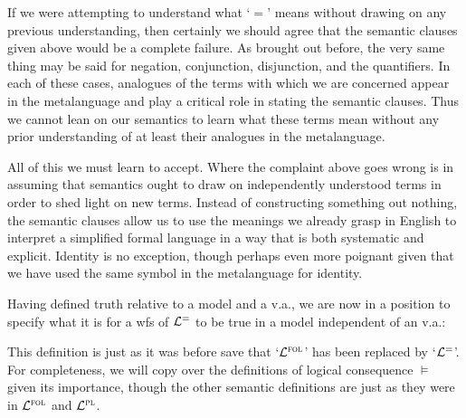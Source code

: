 If we were attempting to understand what `$=$' means without drawing on any previous understanding, then certainly we should agree that the semantic clauses given above would be a complete failure.
As brought out before, the very same thing may be said for negation, conjunction, disjunction, and the quantifiers.
In each of these cases, analogues of the terms with which we are concerned appear in the metalanguage and play a critical role in stating the semantic clauses.
Thus we cannot lean on our semantics to learn what these terms mean without any prior understanding of at least their analogues in the metalanguage.

All of this we must learn to accept.
Where the complaint above goes wrong is in assuming that semantics ought to draw on independently understood terms in order to shed light on new terms.
Instead of constructing something out nothing, the semantic clauses allow us to use the meanings we already grasp in English to interpret a simplified formal language in a way that is both systematic and explicit.
Identity is no exception, though perhaps even more poignant given that we have used the same symbol in the metalanguage for identity.

Having defined truth relative to a model and a v.a., we are now in a position to specify what it is for a wfs of $\mathcal{L}^{=}$ to be true in a model independent of an v.a.:


This definition is just as it was before save that `$\mathcal{L}^{\textsc{fol}}$' has been replaced by `$\mathcal{L}^{=}$'.
For completeness, we will copy over the definitions of logical consequence $\vDash$ given its importance, though the other semantic definitions are just as they were in $\mathcal{L}^{\textsc{fol}}$ and $\mathcal{L}^{\textsc{pl}}$.


